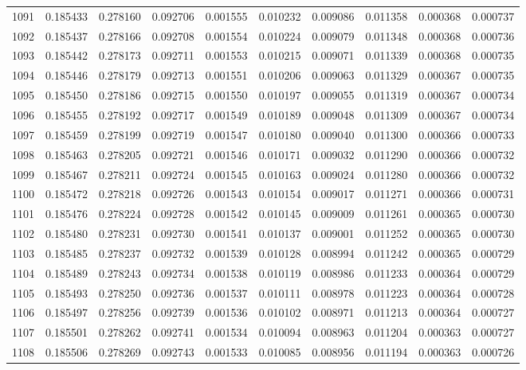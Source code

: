 \begin{tabular}{lrrrrrrrrr}
1091 & 0.185433 & 0.278160 & 0.092706 & 0.001555 & 0.010232 & 0.009086 & 0.011358 & 0.000368 & 0.000737 \\
1092 & 0.185437 & 0.278166 & 0.092708 & 0.001554 & 0.010224 & 0.009079 & 0.011348 & 0.000368 & 0.000736 \\
1093 & 0.185442 & 0.278173 & 0.092711 & 0.001553 & 0.010215 & 0.009071 & 0.011339 & 0.000368 & 0.000735 \\
1094 & 0.185446 & 0.278179 & 0.092713 & 0.001551 & 0.010206 & 0.009063 & 0.011329 & 0.000367 & 0.000735 \\
1095 & 0.185450 & 0.278186 & 0.092715 & 0.001550 & 0.010197 & 0.009055 & 0.011319 & 0.000367 & 0.000734 \\
1096 & 0.185455 & 0.278192 & 0.092717 & 0.001549 & 0.010189 & 0.009048 & 0.011309 & 0.000367 & 0.000734 \\
1097 & 0.185459 & 0.278199 & 0.092719 & 0.001547 & 0.010180 & 0.009040 & 0.011300 & 0.000366 & 0.000733 \\
1098 & 0.185463 & 0.278205 & 0.092721 & 0.001546 & 0.010171 & 0.009032 & 0.011290 & 0.000366 & 0.000732 \\
1099 & 0.185467 & 0.278211 & 0.092724 & 0.001545 & 0.010163 & 0.009024 & 0.011280 & 0.000366 & 0.000732 \\
1100 & 0.185472 & 0.278218 & 0.092726 & 0.001543 & 0.010154 & 0.009017 & 0.011271 & 0.000366 & 0.000731 \\
1101 & 0.185476 & 0.278224 & 0.092728 & 0.001542 & 0.010145 & 0.009009 & 0.011261 & 0.000365 & 0.000730 \\
1102 & 0.185480 & 0.278231 & 0.092730 & 0.001541 & 0.010137 & 0.009001 & 0.011252 & 0.000365 & 0.000730 \\
1103 & 0.185485 & 0.278237 & 0.092732 & 0.001539 & 0.010128 & 0.008994 & 0.011242 & 0.000365 & 0.000729 \\
1104 & 0.185489 & 0.278243 & 0.092734 & 0.001538 & 0.010119 & 0.008986 & 0.011233 & 0.000364 & 0.000729 \\
1105 & 0.185493 & 0.278250 & 0.092736 & 0.001537 & 0.010111 & 0.008978 & 0.011223 & 0.000364 & 0.000728 \\
1106 & 0.185497 & 0.278256 & 0.092739 & 0.001536 & 0.010102 & 0.008971 & 0.011213 & 0.000364 & 0.000727 \\
1107 & 0.185501 & 0.278262 & 0.092741 & 0.001534 & 0.010094 & 0.008963 & 0.011204 & 0.000363 & 0.000727 \\
1108 & 0.185506 & 0.278269 & 0.092743 & 0.001533 & 0.010085 & 0.008956 & 0.011194 & 0.000363 & 0.000726 \\

\end{tabular}
